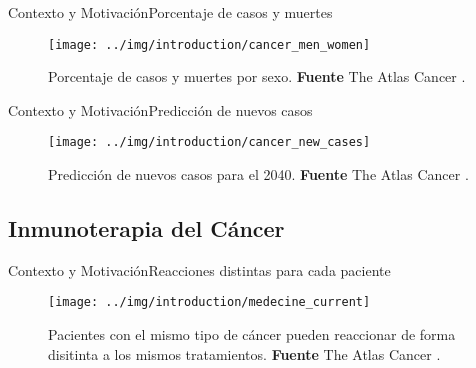 \documentclass[10pt]{beamer}
\newcommand{\1}{
	\setbeamertemplate{background}{
		\texttt{[image: img/1]}
		\tikz[overlay] \fill[fill opacity=0.75,fill=white] (0,0) rectangle (-\paperwidth,\paperheight);
	}
}
\begin{document}
\begin{frame}{Contexto y Motivación}{Porcentaje de casos y muertes}
	\begin{figure}[]
		\centering
		\texttt{[image: ../img/introduction/cancer\_men\_women]}
		\caption{Porcentaje de casos y muertes por sexo. \textbf{Fuente} The Atlas Cancer \cite{canceratlas2023}.}
	\end{figure}
\end{frame}

\begin{frame}{Contexto y Motivación}{Predicción de nuevos casos}
	\begin{figure}[]
		\centering
		\texttt{[image: ../img/introduction/cancer\_new\_cases]}
		\caption{Predicción de nuevos casos para el 2040. \textbf{Fuente} The Atlas Cancer \cite{canceratlas2023}.}
	\end{figure}
\end{frame}

\subsection{Inmunoterapia del Cáncer}



\begin{frame}{Contexto y Motivación}{Reacciones distintas para cada paciente}

	\begin{figure}[]
		\centering
		\texttt{[image: ../img/introduction/medecine\_current]}
			\caption{Pacientes con el mismo tipo de cáncer pueden reaccionar de forma disitinta a los mismos tratamientos. \textbf{Fuente} The Atlas Cancer \cite{pdx2023}.}
	\end{figure}
\end{frame}
\end{document}
